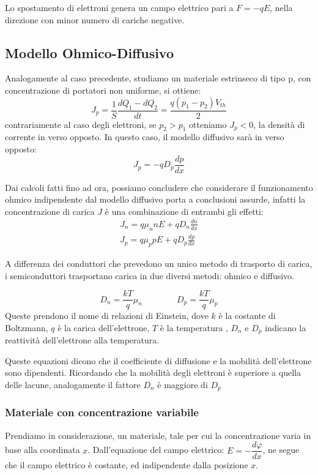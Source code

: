 \documentclass[../template]{subfiles}
\begin{document}
Lo spostamento di elettroni genera un campo elettrico pari a $F = -q E$, nella direzione con minor numero di cariche negative.

\subsection{Modello Ohmico-Diffusivo}
Analogamente al caso precedente, studiamo un materiale estrinseco di tipo p, con concentrazione di portatori non uniforme, si ottiene:
\[
    J_p = \frac{1}{S}\frac{dQ_1 - dQ_2}{dt} = \frac{q(p_1 - p_2) V_{th}}{2}
\]
contrariamente al caso degli elettroni, se $p_2 > p_1$ otteniamo $J_p < 0$, la densità di corrente in verso opposto.
In questo caso, il modello diffusivo sarà in verso opposto:
$$J_p = -qD_p \frac{dp}{dx}$$

Dai calcoli fatti fino ad ora, possiamo concludere che considerare il funzionamento ohmico indipendente dal modello diffusivo
porta a conclusioni assurde, infatti la concentrazione di carica $J$ è una combinazione di entrambi gli effetti:
\begin{align*}
    J_n = q \mu_n n E + q D_n \frac{dn}{dx} \\
    J_p = q \mu_p p E + q D_p \frac{dp}{dx}
\end{align*}

A differenza dei conduttori che prevedono un unico metodo di trasporto di carica, i semiconduttori trasportano carica in due
diversi metodi: ohmico e diffusivo.

\[
    D_n = \frac{kT}{q} \mu_n \qquad \qquad
    D_p = \frac{kT}{q} \mu_p
\]
Queste prendono il nome di relazioni di Einstein, dove $k$ è la costante di Boltzmann, $q$ è la carica dell'elettrone, $T$ è la temperatura
, $D_n$ e $D_p$ indicano la reattività dell'elettrone alla temperatura.

Queste equazioni dicono che il coefficiente di diffusione e la mobilità dell'elettrone sono dipendenti.
Ricordando che la mobilità degli elettroni è superiore a quella delle lacune, analogamente il fattore $D_n$ è maggiore di $D_p$

\subsubsection{Materiale con concentrazione variabile}
Prendiamo in considerazione, un materiale, tale per cui la concentrazione varia in base alla coordinata $x$.
Dall'equazione del campo elettrico: $E = -\dfrac{d\varphi}{dx}$, ne segue che il campo elettrico è costante, ed indipendente dalla posizione $x$.
\end{document}
